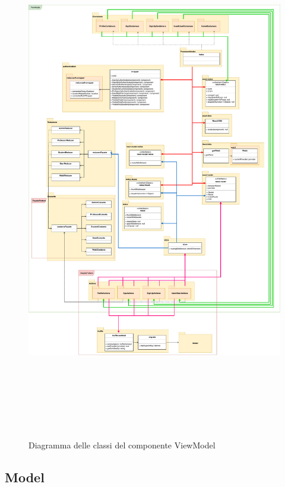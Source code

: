 	\clearpage
	\begin{figure}[hp]
		\centering
			\includegraphics[height=9in]{./Diagrammi/DiagrammaModelView.pdf}
		\caption{Diagramma delle classi del componente ViewModel}
		\label{fig:DiagrammaViewModel}
	\end{figure}
	\clearpage	
	
\subsection{Model}
